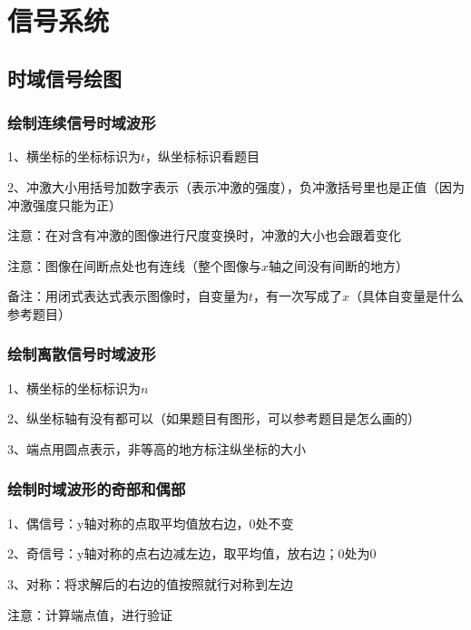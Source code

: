 \chapter{信号系统}

\section{时域信号绘图}



\subsection{绘制连续信号时域波形}

1、横坐标的坐标标识为$t$，纵坐标标识看题目

2、冲激大小用括号加数字表示（表示冲激的强度），负冲激括号里也是正值（因为冲激强度只能为正）

注意：在对含有冲激的图像进行尺度变换时，冲激的大小也会跟着变化

注意：图像在间断点处也有连线（整个图像与$x$轴之间没有间断的地方）

备注：用闭式表达式表示图像时，自变量为$t$，有一次写成了$x$（具体自变量是什么参考题目）



\subsection{绘制离散信号时域波形}

1、横坐标的坐标标识为$n$

2、纵坐标轴有没有都可以（如果题目有图形，可以参考题目是怎么画的）

3、端点用圆点表示，非等高的地方标注纵坐标的大小



\subsection{绘制时域波形的奇部和偶部}

1、偶信号：y轴对称的点取平均值放右边，0处不变

2、奇信号：y轴对称的点右边减左边，取平均值，放右边；0处为0

3、对称：将求解后的右边的值按照就行对称到左边

注意：计算端点值，进行验证



